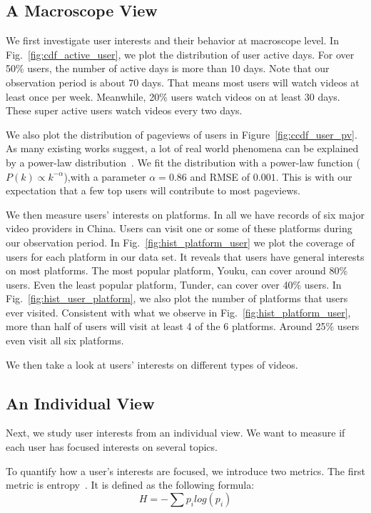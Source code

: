 \subsection{A Macroscope View}

We first investigate user interests and their behavior at macroscope
level. In Fig.~\ref{fig:cdf_active_user}, we plot the distribution of
user active days. For over 50\% users, the number of active days is
more than 10 days. Note that our observation period is about 70
days. That means most users will watch videos at least once per
week. Meanwhile, 20\% users watch videos on at least 30 days. These
super active users watch videos every two days.

We also plot the distribution of pageviews of users in
Figure~\ref{fig:ccdf_user_pv}. As many existing works suggest, a lot
of real world phenomena can be explained by a power-law
distribution~\cite{xxx}. We fit the distribution with a power-law
function ($P(k) \propto k^{-\alpha}$),with a parameter $\alpha=0.86$
and RMSE of $0.001$. This is with our
expectation that a few top users will contribute to most pageviews. 

We then measure users' interests on platforms. In all we have records
of six major video providers in China. Users can visit one or some of
these platforms during our observation period. In
Fig.~\ref{fig:hist_platform_user} we plot the coverage of users for
each platform in our data set. It reveals that users have general
interests on most platforms. The most popular platform, Youku, can
cover around 80\% users. Even the least popular platform, Tunder, can
cover over 40\% users. In Fig.~\ref{fig:hist_user_platform}, we also plot
the number of platforms that users ever visited. Consistent with what
we observe in Fig.~\ref{fig:hist_platform_user}, more than half of
users will visit at least 4 of the 6 platforms. Around 25\% users even
visit all six platforms. 

We then take a look at users' interests on different types of
videos.  

\subsection{An Individual View}
Next, we study user interests from an individual view. We want to
measure if each user has focused interests on several topics. 

To
quantify how a user's interests are focused, we introduce two
metrics. The first metric is entropy~\cite{xxx}. It is defined as the
following formula:
\begin{equation}
H=-\sum p_{i}log(p_{i})
\end{equation}

